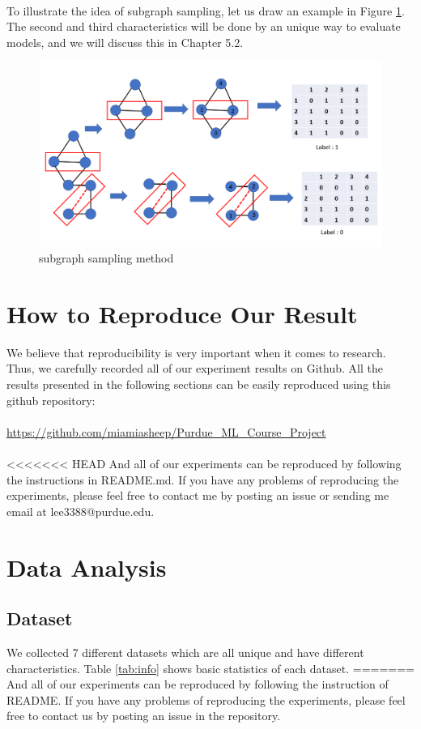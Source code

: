 \documentclass[12pt]{article}
\begin{document}
\\ 
To illustrate the idea of subgraph sampling, let us draw an example in Figure \ref{fig:subsample}. 
\\
The second and third characteristics will be done by an unique way to evaluate models, and we will discuss this in Chapter 5.2. 
\\
\begin{figure}[h]
	\centering
	\includegraphics[scale=0.5]{subgraph_sampling_approach}
	\caption{subgraph sampling method}
	\label{fig:subsample}
\end{figure}

\section{How to Reproduce Our Result}
We believe that reproducibility is very important when it comes to research. Thus, we carefully recorded all of our experiment results on Github. All the results presented in the following sections can be easily reproduced using this github repository: 
\\
\\
\url{https://github.com/miamiasheep/Purdue\_ML\_Course\_Project}
\\
\\
<<<<<<< HEAD
And all of our experiments can be reproduced by following the instructions in README.md. If you have any problems of reproducing the experiments, please feel free to contact me by posting an issue or sending me email at lee3388@purdue.edu.

\section{Data Analysis}

\subsection {Dataset}
We collected 7 different datasets which are all unique and have different characteristics. Table \ref{tab:info} shows basic statistics of each dataset.
=======
And all of our experiments can be reproduced by following the instruction of README. If you have any problems of reproducing the experiments, please feel free to contact us by posting an issue in the repository.
\end{document}

